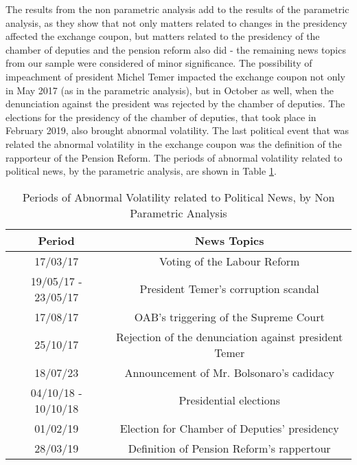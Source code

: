 \documentclass[cic,tc, english]{iiufrgs}
\begin{document}
    The results from the non parametric analysis add to the results of the parametric analysis, as they show that not only matters related to changes in the presidency affected the exchange coupon, but matters related to the presidency of the chamber of deputies and the pension reform also did - the remaining news topics from our sample were considered of minor significance. The possibility of impeachment of president Michel Temer impacted the exchange coupon not only in May 2017 (as in the parametric analysis), but in October as well, when the denunciation against the president was rejected by the chamber of deputies. The elections for the presidency of the chamber of deputies, that took place in February 2019, also brought abnormal volatility. The last political event that was related the abnormal volatility in the exchange coupon was the definition of the rapporteur of the Pension Reform. The periods of abnormal volatility related to political news, by the parametric analysis, are shown in Table \ref{tab:resnon}.

    \begin{table}[H]
        \caption{Periods of Abnormal Volatility related to Political News, by Non Parametric Analysis}
        \label{tab:resnon}
        \centering
        \begin{tabular}{| c | c |}
            \hline
            Period & News Topics \\
            \hline \hline
            17/03/17 & Voting of the Labour Reform \\
            \hline
            19/05/17 - 23/05/17 & President Temer's corruption scandal \\
            \hline
            17/08/17 & OAB's triggering of the Supreme Court \\
            \hline
            25/10/17 & Rejection of the denunciation against president Temer \\
            \hline
            18/07/23 & Announcement of Mr. Bolsonaro's cadidacy \\
            \hline
            04/10/18 - 10/10/18 & Presidential elections \\
            \hline
            01/02/19 & Election for Chamber of Deputies' presidency \\
            \hline
            28/03/19 & Definition of Pension Reform's rappertour \\
            \hline
        \end{tabular}
    \end{table}
\end{document}
